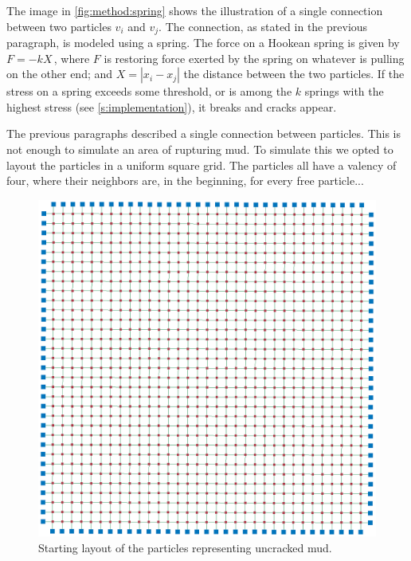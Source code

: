 The image in \cref{fig:method:spring} shows the illustration of a single connection between two particles $v_i$ and $v_j$. The connection, as stated in the previous paragraph, is modeled using a spring. The force on a Hookean spring is given by $F = -k X\,$, where $F$ is restoring force exerted by the spring on whatever is pulling on the other end; and $X = |x_i - x_j|$ the distance between the two particles. If the stress on a spring exceeds some threshold, or is among the $k$ springs with the highest stress (see \cref{s:implementation}), it breaks and cracks appear.


The previous paragraphs described a single connection between particles. This is not enough to simulate an area of rupturing mud. To simulate this we opted to layout the particles in a uniform square grid. The particles all have a valency of four, where their neighbors are, in the beginning, for every free particle... 

\begin{figure}
	\centering
	\includegraphics[width=0.9\columnwidth]{img/uniform_square_grid.png}
	\caption{Starting layout of the particles representing uncracked mud.}
	\label{fig:model:layout}
\end{figure}

